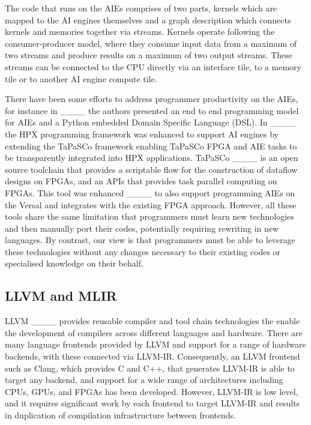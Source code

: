 The code that runs on the AIEs comprises of two parts, kernels which are mapped to the AI engines themselves and a graph description which connects kernels and memories together via streams. Kernels operate following the consumer-producer model, where they consume input data from a maximum of two streams and produce results on a maximum of two output streams. These streams can be connected to the CPU directly via an interface tile, to a memory tile or to another AI engine compute tile.

There have been some efforts to address programmer productivity on the AIEs, for instance in ____ the authors presented an end to end programming model for AIEs and a Python embedded Domain Specific Language (DSL). In ____ the HPX programming framework was enhanced to support AI engines by extending the TaPaSCo framework enabling TaPaSCo FPGA and AIE tasks to be transparently integrated into HPX applications. TaPaSCo ____ is an open source toolchain that provides a scriptable flow for the construction of dataflow designs on FPGAs, and an APIs that provides task parallel computing on FPGAs. This tool was enhanced ____ to also support programming AIEs on the Versal and integrates with the existing FPGA approach. However, all these tools share the same limitation that programmers must learn new technologies and then manually port their codes, potentially requiring rewriting in new languages. By contrast, our view is that programmers must be able to leverage these technologies without any changes necessary to their existing codes or specialised knowledge on their behalf.

\subsection{LLVM and MLIR}

LLVM ____ provides reusable compiler and tool chain technologies the enable the development of compilers across different languages and hardware. There are many language frontends provided by LLVM and support for a range of hardware backends, with these connected via LLVM-IR. Consequently, an LLVM frontend such as Clang, which provides C and C++, that generates LLVM-IR is able to target any backend, and support for a wide range of architectures including CPUs, GPUs, and FPGAs has been developed. However, LLVM-IR is low level, and it requires significant work by each frontend to target LLVM-IR and results in duplication of compilation infrastructure between frontends.

